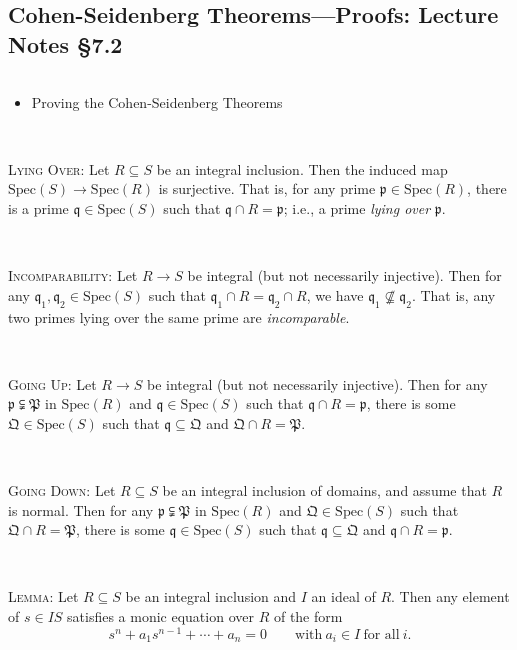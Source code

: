 \documentclass[12pt]{amsart}
\newcommand{\p}{\mathfrak{p}}
\newcommand{\q}{\mathfrak{q}}
\newcommand{\Spec}{\mathrm{Spec}}
\newcommand{\0}{$\phantom{.}$}
\newcommand{\1}{\mathbbm{1}}
\begin{document}
\newpage

\subsection{Cohen-Seidenberg Theorems---Proofs: Lecture Notes \S7.2} \0

\begin{framed}
\begin{itemize}
\item Proving the Cohen-Seidenberg Theorems
\end{itemize}
\end{framed}

\


\noindent \textsc{Lying Over:} Let $R\subseteq S$ be an integral inclusion. Then the induced map ${\Spec(S)\to \Spec(R)}$ is surjective. That is, for any prime $\p\in \Spec(R)$, there is a prime $\q\in \Spec(S)$ such that $\q \cap R =\p$; i.e., a prime \emph{lying over} $\p$.

\

\noindent \textsc{Incomparability:} Let $R\to S$ be integral (but not necessarily injective). Then for any ${\q_1,\q_2\in \Spec(S)}$ such that $\q_1 \cap R = \q_2 \cap R$, we have $\q_1 \not\nsubseteq \q_2$. That is, any two primes lying over the same prime are \emph{incomparable}.


\

\noindent \textsc{Going Up:} Let $R\to S$ be integral (but not necessarily injective). Then for any $\p \subsetneqq \mathfrak{P}$ in $\Spec(R)$ and $\q\in \Spec(S)$ such that $\q \cap R = \p$, there is some $\mathfrak{Q}\in \Spec(S)$ such that $\q \subseteq \mathfrak{Q}$ and $\mathfrak{Q} \cap R = \mathfrak{P}$. 

\

\noindent \textsc{Going Down:} Let $R\subseteq S$ be an integral inclusion of domains, and assume that $R$ is normal. Then for any $\p \subsetneqq \mathfrak{P}$  in $\Spec(R)$ and $\mathfrak{Q}\in \Spec(S)$ such that $\mathfrak{Q} \cap R = \mathfrak{P}$, there is some $\q\in \Spec(S)$ such that $\q \subseteq \mathfrak{Q}$ and $\q \cap R = \p$. 

\

\noindent \textsc{Lemma:} Let $R\subseteq S$ be an integral inclusion and $I$ an ideal of $R$. Then any element of $s\in IS$ satisfies a monic equation over $R$ of the form\footnotemark
\[ s^n + a_1 s^{n-1} + \cdots + a_n = 0 \qquad \text{with} \ a_i\in I \ \text{for all} \ i.\]
\end{document}
